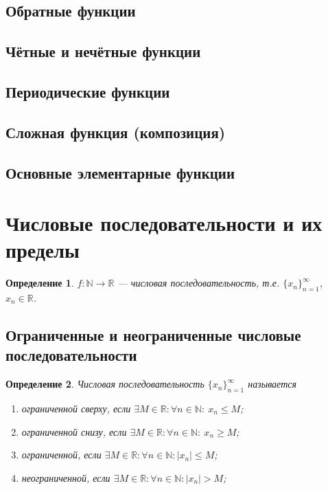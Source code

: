 \documentclass[a4paper,12pt]{article} %
\newtheorem{definition}{Определение}[subsection]
\theoremstyle{remark}
\begin{document}
\subsection{Обратные функции}
\subsection{Чётные и нечётные функции}
\subsection{Периодические функции}
\subsection{Сложная функция (композиция)}
\subsection{Основные элементарные функции}

\section{Числовые последовательности и их пределы}
\begin{definition}
	$f:\mathbb{N}\rightarrow \mathbb{R}$ --- числовая последовательность, т.е. $\{x_n\}_{n=1}^\infty$, $x_n \in \mathbb{R}$.
\end{definition}

\subsection{Ограниченные и неограниченные числовые последовательности}

\begin{definition}
	Числовая последовательность $\{x_n\}_{n=1}^\infty$ называется 

	\begin{enumerate}
		\item ограниченной сверху, если $\exists M\in \mathbb{R}: \forall n\in \mathbb{N}: \ x_n\le M$;
		\item ограниченной снизу, если \space $\exists M\in \mathbb{R}: \forall n\in \mathbb{N}: \ x_n\ge M$;
		\item ограниченной, если \space\space\space\space\space\space\space\space\space $\exists M\in \mathbb{R}: \forall n\in \mathbb{N}:|x_n| \le M$;
		\item неограниченной, если \space\space\space\space\space\space $\exists M\in \mathbb{R}: \forall n\in \mathbb{N}:|x_n|> M$;
	\end{enumerate}
\end{definition}
\end{document}
